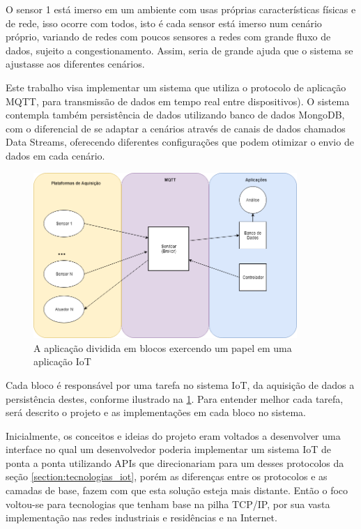 O sensor 1 está imerso em um ambiente com usas próprias características físicas e de rede, isso ocorre com todos, isto é cada sensor está imerso num cenário próprio, variando de redes com poucos sensores a redes com grande fluxo de dados, sujeito a congestionamento. Assim, seria de grande ajuda que o  sistema se ajustasse aos diferentes cenários.

Este trabalho visa implementar um sistema que utiliza o protocolo de aplicação MQTT, para transmissão de dados em tempo real entre dispositivos). O sistema contempla também persistência de dados utilizando banco de dados MongoDB, com o diferencial de se adaptar a cenários através de canais de dados chamados Data Streams, oferecendo diferentes configurações que podem otimizar o envio de dados em cada cenário.

\begin{figure}[h!]
\centering
\includegraphics[width=10cm]{./02_Capitulos/02_Cap1/figures/iot_app-layers}
\caption{A aplicação dividida em blocos exercendo um papel em uma aplicação IoT}
\label{fig:1.1.0/iot_app-layers}
\end{figure}


Cada bloco é responsável por uma tarefa no sistema IoT, da aquisição de dados a persistência destes, conforme ilustrado na \ref{fig:1.1.0/iot_app-layers}. Para entender melhor cada tarefa, será descrito o projeto e as implementações em cada bloco no sistema.

Inicialmente, os conceitos e ideias do projeto eram voltados a desenvolver uma interface no qual um desenvolvedor poderia implementar um sistema IoT de ponta a ponta utilizando APIs que direcionariam para um desses protocolos da seção \ref{section:tecnologias_iot}, porém as diferenças entre os protocolos e as camadas de base, fazem com que esta solução esteja mais distante. Então o foco voltou-se  para tecnologias que tenham base na pilha TCP/IP, por sua vasta implementação nas redes industriais e residências e na Internet.
